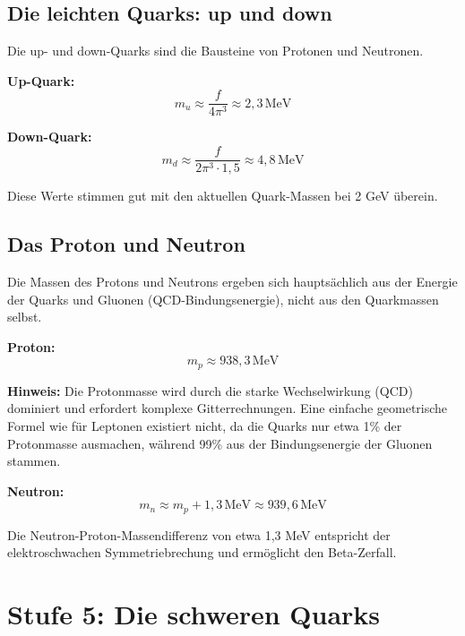 	\subsection{Die leichten Quarks: up und down}
	
	Die up- und down-Quarks sind die Bausteine von Protonen und Neutronen.
	
	\textbf{Up-Quark:}
	\begin{equation}
		m_u \approx \frac{f}{4\pi^3} \approx 2{,}3\,\text{MeV}
	\end{equation}
	
	\textbf{Down-Quark:}
	\begin{equation}
		m_d \approx \frac{f}{2\pi^3 \cdot 1{,}5} \approx 4{,}8\,\text{MeV}
	\end{equation}
	
	Diese Werte stimmen gut mit den aktuellen Quark-Massen bei 2 GeV überein.
	
	\subsection{Das Proton und Neutron}
	
	Die Massen des Protons und Neutrons ergeben sich hauptsächlich aus der Energie der Quarks und Gluonen (QCD-Bindungsenergie), nicht aus den Quarkmassen selbst.
	
	\textbf{Proton:}
	\begin{equation}
		m_p \approx 938{,}3\,\text{MeV}
	\end{equation}
	
	\textbf{Hinweis:} Die Protonmasse wird durch die starke Wechselwirkung (QCD) dominiert und erfordert komplexe Gitterrechnungen. Eine einfache geometrische Formel wie für Leptonen existiert nicht, da die Quarks nur etwa 1\% der Protonmasse ausmachen, während 99\% aus der Bindungsenergie der Gluonen stammen.
	
	\textbf{Neutron:}
	\begin{equation}
		m_n \approx m_p + 1{,}3\,\text{MeV} \approx 939{,}6\,\text{MeV}
	\end{equation}
	
	Die Neutron-Proton-Massendifferenz von etwa 1{,}3 MeV entspricht der elektroschwachen Symmetriebrechung und ermöglicht den Beta-Zerfall.
	
	\section{Stufe 5: Die schweren Quarks}
	
